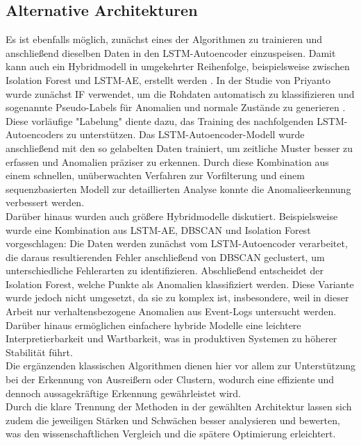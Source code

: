 \documentclass[a4paper,12pt]{article}
\begin{document}
	\subsection{Alternative Architekturen}
	Es ist ebenfalls möglich, zunächst eines der Algorithmen zu trainieren und anschließend dieselben Daten in den LSTM-Autoencoder einzuspeisen. Damit kann auch ein Hybridmodell in umgekehrter Reihenfolge, beispielsweise zwischen Isolation Forest und LSTM-AE, erstellt werden \cite{priyanto2021combination}. In der Studie von Priyanto wurde zunächst IF verwendet, um die Rohdaten automatisch zu klassifizieren und sogenannte Pseudo-Labels für Anomalien und normale Zustände zu generieren \cite{priyanto2021combination}. Diese vorläufige "Labelung" diente dazu, das Training des nachfolgenden LSTM-Autoencoders zu unterstützen. Das LSTM-Autoencoder-Modell wurde anschließend mit den so gelabelten Daten trainiert, um zeitliche Muster besser zu erfassen und Anomalien präziser zu erkennen. Durch diese Kombination aus einem schnellen, unüberwachten Verfahren zur Vorfilterung und einem sequenzbasierten Modell zur detaillierten Analyse konnte die Anomalieerkennung verbessert werden.
	\\[0.5em]
	Darüber hinaus wurden auch größere Hybridmodelle diskutiert. Beispielsweise wurde eine Kombination aus LSTM-AE, DBSCAN und Isolation Forest vorgeschlagen: Die Daten werden zunächst vom LSTM-Autoencoder verarbeitet, die daraus resultierenden Fehler anschließend von DBSCAN geclustert, um unterschiedliche Fehlerarten zu identifizieren. Abschließend entscheidet der Isolation Forest, welche Punkte als Anomalien klassifiziert werden. Diese Variante wurde jedoch nicht umgesetzt, da sie zu komplex ist, insbesondere, weil in dieser Arbeit nur verhaltensbezogene Anomalien aus Event-Logs untersucht werden.
	\\[0.5em]
	Darüber hinaus ermöglichen einfachere hybride Modelle eine leichtere Interpretierbarkeit und Wartbarkeit, was in produktiven Systemen zu höherer Stabilität führt.
	\\[0.5em]
	Die ergänzenden klassischen Algorithmen dienen hier vor allem zur Unterstützung bei der Erkennung von Ausreißern oder Clustern, wodurch eine effiziente und dennoch aussagekräftige Erkennung gewährleistet wird.
	\\[0.5em]
	Durch die klare Trennung der Methoden in der gewählten Architektur lassen sich zudem die jeweiligen Stärken und Schwächen besser analysieren und bewerten, was den wissenschaftlichen Vergleich und die spätere Optimierung erleichtert.
	\\[0.5em]
\end{document}
